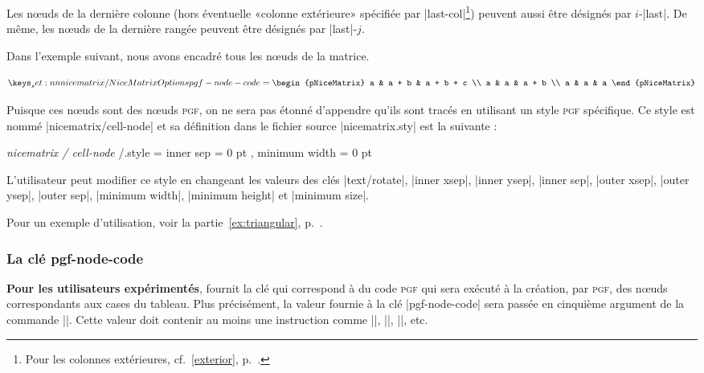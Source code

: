\documentclass[dvipsnames]{article}
\begin{document}
\medskip
Les nœuds de la dernière colonne (hors éventuelle «colonne extérieure» spécifiée
par |last-col|\footnote{Pour les colonnes extérieures, cf.~\ref{exterior},
  p.~\pageref{exterior}.}) peuvent aussi être désignés par $i$-|last|. De même,
les nœuds de la dernière rangée peuvent être désignés par |last|-$j$.


\medskip
Dans l'exemple suivant, nous avons encadré tous les nœuds de la matrice.

\[
\NiceMatrixOptions
  { 
    pgf-node-code = 
     {
       \pgfsetstrokecolor{red}%
       \pgfusepathqstroke
     } 
  }
\begin{pNiceMatrix}
a & a + b & a + b + c \\
a & a     & a + b  \\
a & a     & a
\end{pNiceMatrix}\]

\bigskip
Puisque ces nœuds sont des nœuds \textsc{pgf}, on ne sera pas étonné d'appendre qu'ils
sont tracés en utilisant un style \textsc{pgf} spécifique. Ce style est nommé
|nicematrix/cell-node| et sa définition dans le fichier source |nicematrix.sty|
est la suivante :

\label{cell-node}

\begin{Code}[annotation = false]
\pgfset 
  { 
    \emph{nicematrix / cell-node} /.style = 
     {
       inner sep = 0 pt ,
       minimum width = 0 pt
     }
  }
\end{Code}

L'utilisateur peut modifier ce style en changeant les valeurs des clés |text/rotate|,
|inner xsep|, |inner ysep|, |inner sep|, |outer xsep|, |outer ysep|, |outer sep|,
|minimum width|, |minimum height| et |minimum size|.

\medskip
Pour un exemple d'utilisation, voir la partie~\ref{ex:triangular},
p.~\pageref{ex:triangular}. 

\subsubsection{La clé pgf-node-code}

\textbf{Pour les utilisateurs expérimentés},  fournit la clé
 qui correspond à du code \textsc{pgf} qui sera exécuté à la
création, par \textsc{pgf}, des nœuds correspondants aux cases du tableau. Plus
précisément, la valeur fournie à la clé |pgf-node-code| sera passée en cinquième
argument de la commande |\pgfnode|. Cette valeur doit contenir au moins une
instruction comme |\pgfusepath|, |\pgfusepathqstroke|, |\pgfusepathqfill|, etc.
\end{document}
